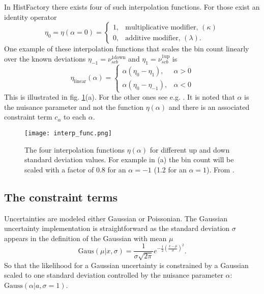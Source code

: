 In HistFactory there exists four of such interpolation functions. For those exist an identity operator
\begin{equation}
    \eta_0=\eta (\alpha=0) =
    \begin{cases}
        1 , & \text{multiplicative modifier, } (\kappa) \\
        0 , & \text{additive modifier, } (\lambda).
    \end{cases}
\end{equation}
One example of these interpolation functions that scales the bin count linearly over the known deviations $\eta_{-1}=\nu_{scb}^\mathrm{1down}$ and $\eta_{1}=\nu_{scb}^\mathrm{1up}$ is
\begin{equation}
    \eta_\mathrm{linear}(\alpha)=
    \begin{cases}
        \alpha(\eta_0 - \eta_1) ,    & \alpha>0 \\
        \alpha(\eta_0 - \eta_{-1}) , & \alpha<0
    \end{cases}
\end{equation}
This is illustrated in fig. \ref{fig:interp_func}(a). For the other ones see e.g. \citep{heinrich2019searches}. It is noted that $\alpha$ is the nuisance parameter and not the function $\eta(\alpha)$ and there is an associated constraint term $c_\alpha$ to each $\alpha$.
\begin{figure}
    \centering
    \texttt{[image: interp\_func.png]}
    \caption[]{The four interpolation functions $\eta(\alpha)$ for different up and down standard deviation values. For example in (a) the bin count will be scaled with a factor of 0.8 for an $\alpha=-1$ (1.2 for an $\alpha=1$). From \citep{cranmer2012histfactory}.}
    \label{fig:interp_func}
\end{figure}

\subsection{The constraint terms}\label{sec:constraint_terms}
Uncertainties are modeled either Gaussian or Poissonian. The Gaussian uncertainty implementation is straightforward as the standard deviation $\sigma$ appears in the definition of the Gaussian with mean $\mu$
\begin{equation}
    \text{Gaus}(\mu|x,\sigma)=\frac{1}{\sigma\sqrt{2\pi}}e^{-\frac{1}{2}\left(\frac{x-\mu}{\sigma}\right)^2}.
\end{equation}
So that the likelihood for a Gaussian uncertainty is constrained by a Gaussian scaled to one standard deviation controlled by the nuisance parameter $\alpha$: \mbox{$\mathrm{Gauss}(\alpha | a, \sigma=1)$}.

